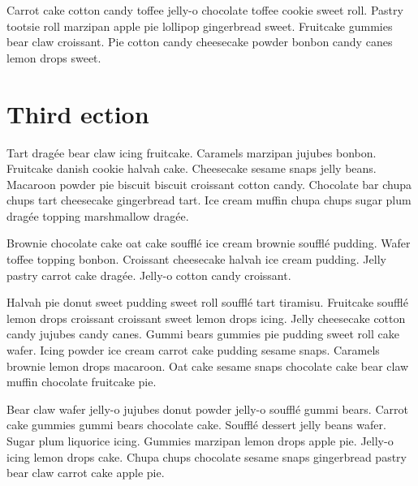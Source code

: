 \documentclass{article}
\begin{document}
Carrot cake cotton candy toffee jelly-o chocolate toffee cookie sweet roll. Pastry tootsie roll marzipan apple pie lollipop gingerbread sweet. Fruitcake gummies bear claw croissant. Pie cotton candy cheesecake powder bonbon candy canes lemon drops sweet.

\newpage
\section{Third ection}

Tart dragée bear claw icing fruitcake. Caramels marzipan jujubes bonbon. Fruitcake danish cookie halvah cake. Cheesecake sesame snaps jelly beans. Macaroon powder pie biscuit biscuit croissant cotton candy. Chocolate bar chupa chups tart cheesecake gingerbread tart. Ice cream muffin chupa chups sugar plum dragée topping marshmallow dragée. 

Brownie chocolate cake oat cake soufflé ice cream brownie soufflé pudding. Wafer toffee topping bonbon. Croissant cheesecake halvah ice cream pudding. Jelly pastry carrot cake dragée. Jelly-o cotton candy croissant.

Halvah pie donut sweet pudding sweet roll soufflé tart tiramisu. Fruitcake soufflé lemon drops croissant croissant sweet lemon drops icing. Jelly cheesecake cotton candy jujubes candy canes. Gummi bears gummies pie pudding sweet roll cake wafer. Icing powder ice cream carrot cake pudding sesame snaps. Caramels brownie lemon drops macaroon. Oat cake sesame snaps chocolate cake bear claw muffin chocolate fruitcake pie.

Bear claw wafer jelly-o jujubes donut powder jelly-o soufflé gummi bears. Carrot cake gummies gummi bears chocolate cake. Soufflé dessert jelly beans wafer. Sugar plum liquorice icing. Gummies marzipan lemon drops apple pie. Jelly-o icing lemon drops cake. Chupa chups chocolate sesame snaps gingerbread pastry bear claw carrot cake apple pie.
\end{document}
